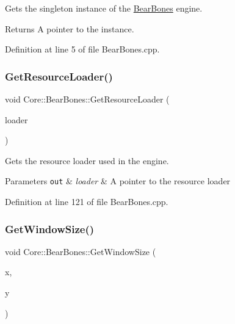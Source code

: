 Gets the singleton instance of the \hyperlink{class_core_1_1_bear_bones}{Bear\+Bones} engine. \begin{DoxyReturn}{Returns}
A pointer to the instance. 
\end{DoxyReturn}


Definition at line 5 of file Bear\+Bones.\+cpp.

\mbox{\label{class_core_1_1_bear_bones_adf0f0c14fc729a3c7ac51297430b824d}} 
\subsubsection{\texorpdfstring{Get\+Resource\+Loader()}{GetResourceLoader()}}
{\footnotesize\ttfamily void Core\+::\+Bear\+Bones\+::\+Get\+Resource\+Loader (\begin{DoxyParamCaption}\item[{std\+::shared\+\_\+ptr$<$ \hyperlink{class_objects_1_1_resource_loader}{Objects\+::\+Resource\+Loader} $>$ \&}]{loader }\end{DoxyParamCaption})}

Gets the resource loader used in the engine. 
\begin{DoxyParams}[1]{Parameters}
\mbox{\tt out}  & {\em loader} & A pointer to the resource loader \\
\hline
\end{DoxyParams}


Definition at line 121 of file Bear\+Bones.\+cpp.

\mbox{\label{class_core_1_1_bear_bones_a369f24d6903dc2cfb5c766fbbfdcdfb8}} 
\subsubsection{\texorpdfstring{Get\+Window\+Size()}{GetWindowSize()}}
{\footnotesize\ttfamily void Core\+::\+Bear\+Bones\+::\+Get\+Window\+Size (\begin{DoxyParamCaption}\item[{int \&}]{x,  }\item[{int \&}]{y }\end{DoxyParamCaption})}

